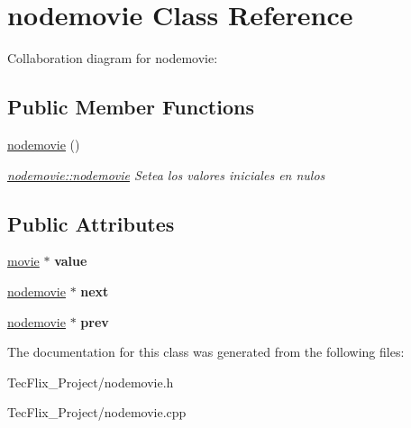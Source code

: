 \hypertarget{classnodemovie}{}\section{nodemovie Class Reference}
\label{classnodemovie}


Collaboration diagram for nodemovie\+:
\subsection*{Public Member Functions}
\begin{DoxyCompactItemize}
\item 
\mbox{\label{classnodemovie_ae892acb1c5f861d27f827022dcdf11a1}} 
\hyperlink{classnodemovie_ae892acb1c5f861d27f827022dcdf11a1}{nodemovie} ()
\begin{DoxyCompactList}\small\item\em \hyperlink{classnodemovie_ae892acb1c5f861d27f827022dcdf11a1}{nodemovie\+::nodemovie} Setea los valores iniciales en nulos \end{DoxyCompactList}\end{DoxyCompactItemize}
\subsection*{Public Attributes}
\begin{DoxyCompactItemize}
\item 
\mbox{\label{classnodemovie_a843cefd98a8525268cf993c6b8449ce1}} 
\hyperlink{classmovie}{movie} $\ast$ {\bfseries value}
\item 
\mbox{\label{classnodemovie_ab0796184b5f7f232d38e99454e0c3423}} 
\hyperlink{classnodemovie}{nodemovie} $\ast$ {\bfseries next}
\item 
\mbox{\label{classnodemovie_a4560c49a01c1709944548e527acc7351}} 
\hyperlink{classnodemovie}{nodemovie} $\ast$ {\bfseries prev}
\end{DoxyCompactItemize}


The documentation for this class was generated from the following files\+:\begin{DoxyCompactItemize}
\item 
Tec\+Flix\+\_\+\+Project/nodemovie.\+h\item 
Tec\+Flix\+\_\+\+Project/nodemovie.\+cpp\end{DoxyCompactItemize}
